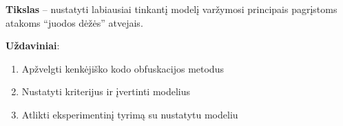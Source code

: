 
\textbf{Tikslas} -- nustatyti labiausiai tinkantį modelį varžymosi principais pagrįstoms atakoms \enquote{juodos dėžės} atvejais.

\textbf{Uždaviniai}:
\begin{enumerate}
    \item Apžvelgti kenkėjiško kodo obfuskacijos metodus
    \item Nustatyti kriterijus ir įvertinti modelius
    \item Atlikti eksperimentinį tyrimą su nustatytu modeliu
\end{enumerate}
